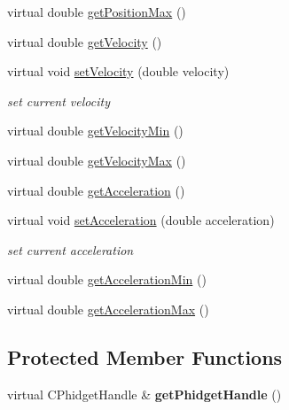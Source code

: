 \begin{DoxyCompactItemize}
\item 
virtual double \hyperlink{classdrobot_1_1device_1_1actuator_1_1PhidgetSimpleServo_a6a0c6bc3edd91bc7cdcbb3ceb6e35499}{get\-Position\-Max} ()
\item 
virtual double \hyperlink{classdrobot_1_1device_1_1actuator_1_1PhidgetSimpleServo_ac95f8be440b0fbed1c9d33b2d919d804}{get\-Velocity} ()
\item 
virtual void \hyperlink{classdrobot_1_1device_1_1actuator_1_1PhidgetSimpleServo_af0c80a2d8cacc535b7b529eb84fc1075}{set\-Velocity} (double velocity)
\begin{DoxyCompactList}\small\item\em set current velocity \end{DoxyCompactList}\item 
virtual double \hyperlink{classdrobot_1_1device_1_1actuator_1_1PhidgetSimpleServo_a9880f9f9f0cd83abc3b8d927316ed843}{get\-Velocity\-Min} ()
\item 
virtual double \hyperlink{classdrobot_1_1device_1_1actuator_1_1PhidgetSimpleServo_aa54b52796cfb651db75b762dc319b38f}{get\-Velocity\-Max} ()
\item 
virtual double \hyperlink{classdrobot_1_1device_1_1actuator_1_1PhidgetSimpleServo_ab9aee84e3e9b714298df2891f9bf9d89}{get\-Acceleration} ()
\item 
virtual void \hyperlink{classdrobot_1_1device_1_1actuator_1_1PhidgetSimpleServo_a9577403e844e3d18f66fd23c2bdf1e8f}{set\-Acceleration} (double acceleration)
\begin{DoxyCompactList}\small\item\em set current acceleration \end{DoxyCompactList}\item 
virtual double \hyperlink{classdrobot_1_1device_1_1actuator_1_1PhidgetSimpleServo_a76961c60cfa11ddae2588555eba8a223}{get\-Acceleration\-Min} ()
\item 
virtual double \hyperlink{classdrobot_1_1device_1_1actuator_1_1PhidgetSimpleServo_a33019d0481fe3e18179291c3090bb8aa}{get\-Acceleration\-Max} ()
\end{DoxyCompactItemize}
\subsection*{Protected Member Functions}
\begin{DoxyCompactItemize}
\item 
\hypertarget{classdrobot_1_1device_1_1actuator_1_1PhidgetSimpleServo_a7651960d50dda3b1e2b4133f25b0da03}{virtual C\-Phidget\-Handle \& {\bfseries get\-Phidget\-Handle} ()}\label{classdrobot_1_1device_1_1actuator_1_1PhidgetSimpleServo_a7651960d50dda3b1e2b4133f25b0da03}

\end{DoxyCompactItemize}
